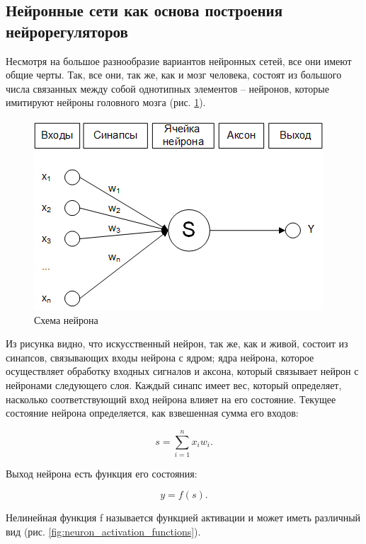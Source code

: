 \subsection{Нейронные сети как основа построения нейрорегуляторов}

Несмотря на большое разнообразие вариантов нейронных сетей, все они имеют общие черты. Так, все они, так же, как и мозг человека, состоят из большого числа связанных между собой однотипных элементов – нейронов, которые имитируют нейроны головного мозга (рис. \ref{fig:neuron_scheme}).

\begin{figure}[H]
    \centering
    \includegraphics{images/chapter1/Схема нейрона.png}
    \caption{Схема нейрона}
    \label{fig:neuron_scheme}
\end{figure}

Из рисунка видно, что искусственный нейрон, так же, как и живой, состоит из синапсов, связывающих входы нейрона с ядром; ядра нейрона, которое осуществляет обработку входных сигналов и аксона, который связывает нейрон с нейронами следующего слоя. Каждый синапс имеет вес, который определяет, насколько соответствующий вход нейрона влияет на его состояние. Текущее состояние нейрона определяется, как взвешенная сумма его входов:

\begin{equation}
    s = \sum_{i=1}^{n}{x_i w_i}.
\end{equation}

Выход нейрона есть функция его состояния:

\begin{equation}
    y = f(s).
\end{equation}

Нелинейная функция f называется функцией активации и может иметь различный вид (рис. \ref{fig:neuron_activation_functions}).

